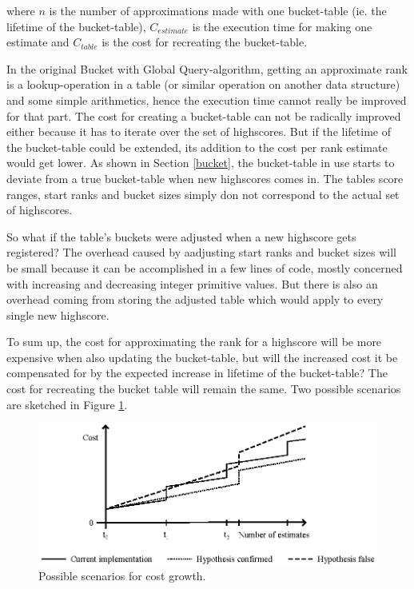 where $n$ is the number of approximations made with one bucket-table (ie. the lifetime of the bucket-table), $C_{estimate}$ is the execution time for making one estimate and $C_{table}$ is the cost for recreating the bucket-table.

In the original Bucket with Global Query-algorithm, getting an approximate rank is a lookup-operation in a table (or similar operation on another data structure) and some simple arithmetics, hence the execution time cannot really be improved for that part. The cost for creating a bucket-table can not be radically improved either because it has to iterate over the set of highscores. But if the lifetime of the bucket-table could be extended, its addition to the cost per rank estimate would get lower. As shown in Section \ref{bucket}, the bucket-table in use starts to deviate from a true bucket-table when new highscores comes in. The tables score ranges, start ranks and bucket sizes simply don not correspond to the actual set of highscores.

So what if the table's buckets were adjusted when a new highscore gets registered? The overhead caused by aadjusting start ranks and bucket sizes will be small because it can be accomplished in a few lines of code, mostly concerned with increasing and decreasing integer primitive values. But there is also an overhead coming from storing the adjusted table which would apply to every single new highscore.

To sum up, the cost for approximating the rank for a highscore will be more expensive when also updating the bucket-table, but will the increased cost it be compensated for by the expected increase in lifetime of the bucket-table? The cost for recreating the bucket table will remain the same. Two possible scenarios are sketched in Figure \ref{fig:cost}.

\begin{figure}[h]
  \centering
  \caption{Possible scenarios for cost growth.}
  \label{fig:cost}
  \includegraphics[width=13cm]{img/hypothesis-cost1.eps}
\end{figure} 

